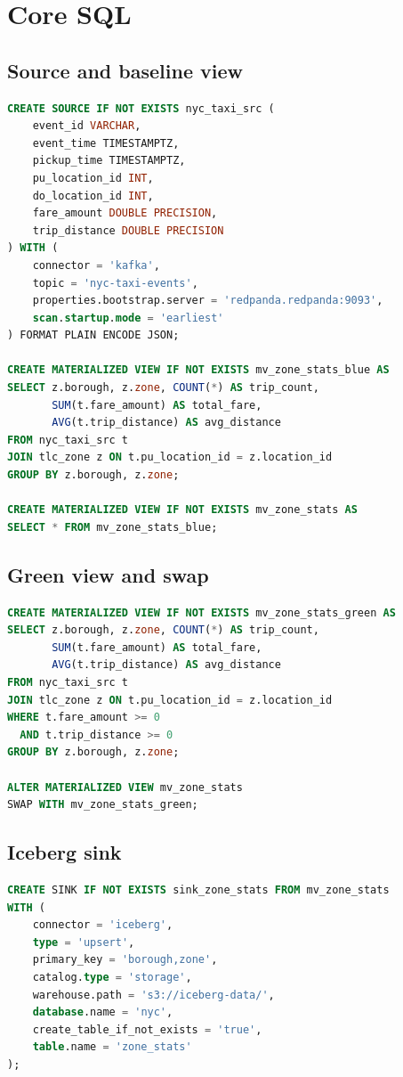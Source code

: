 \section{Core SQL}\label{app:core-sql}
\subsection{Source and baseline view}
\begin{lstlisting}[language=SQL]
CREATE SOURCE IF NOT EXISTS nyc_taxi_src (
    event_id VARCHAR,
    event_time TIMESTAMPTZ,
    pickup_time TIMESTAMPTZ,
    pu_location_id INT,
    do_location_id INT,
    fare_amount DOUBLE PRECISION,
    trip_distance DOUBLE PRECISION
) WITH (
    connector = 'kafka',
    topic = 'nyc-taxi-events',
    properties.bootstrap.server = 'redpanda.redpanda:9093',
    scan.startup.mode = 'earliest'
) FORMAT PLAIN ENCODE JSON;

CREATE MATERIALIZED VIEW IF NOT EXISTS mv_zone_stats_blue AS
SELECT z.borough, z.zone, COUNT(*) AS trip_count,
       SUM(t.fare_amount) AS total_fare,
       AVG(t.trip_distance) AS avg_distance
FROM nyc_taxi_src t
JOIN tlc_zone z ON t.pu_location_id = z.location_id
GROUP BY z.borough, z.zone;

CREATE MATERIALIZED VIEW IF NOT EXISTS mv_zone_stats AS
SELECT * FROM mv_zone_stats_blue;
\end{lstlisting}

\subsection{Green view and swap}
\begin{lstlisting}[language=SQL]
CREATE MATERIALIZED VIEW IF NOT EXISTS mv_zone_stats_green AS
SELECT z.borough, z.zone, COUNT(*) AS trip_count,
       SUM(t.fare_amount) AS total_fare,
       AVG(t.trip_distance) AS avg_distance
FROM nyc_taxi_src t
JOIN tlc_zone z ON t.pu_location_id = z.location_id
WHERE t.fare_amount >= 0
  AND t.trip_distance >= 0
GROUP BY z.borough, z.zone;

ALTER MATERIALIZED VIEW mv_zone_stats
SWAP WITH mv_zone_stats_green;
\end{lstlisting}

\subsection{Iceberg sink}
\begin{lstlisting}[language=SQL]
CREATE SINK IF NOT EXISTS sink_zone_stats FROM mv_zone_stats
WITH (
    connector = 'iceberg',
    type = 'upsert',
    primary_key = 'borough,zone',
    catalog.type = 'storage',
    warehouse.path = 's3://iceberg-data/',
    database.name = 'nyc',
    create_table_if_not_exists = 'true',
    table.name = 'zone_stats'
);
\end{lstlisting}

